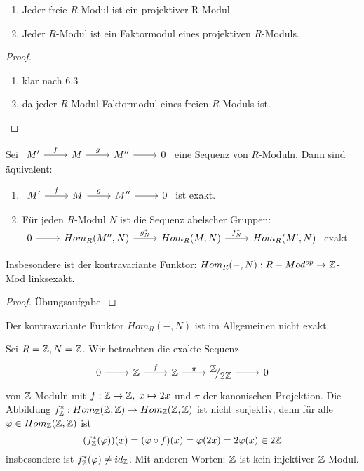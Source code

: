 \begin{fo}\label{6.4}
	\begin{enumerate} [label= \alph*)]
		\item Jeder freie $R$-Modul ist ein projektiver R-Modul
		\item Jeder $R$-Modul ist ein Faktormodul eines projektiven $R$-Moduls. 
	\end{enumerate}
\end{fo}
\begin{proof}
	\begin{enumerate} [label= \alph*)]
		\item klar nach 6.3
		\item da jeder $R$-Modul Faktormodul eines freien $R$-Moduls ist. 
	\end{enumerate}
\end{proof}
\begin{sa}\label{6.5}
	Sei $\begin{tikzcd}
	 M' \arrow{r}{f} & M \arrow{r}{g} & M'' \arrow{r} & 0
	\end{tikzcd} $ eine Sequenz von $R$-Moduln. Dann sind äquivalent:
	\begin{enumerate} [label= \roman*)]
		\item $\begin{tikzcd}
		M' \arrow{r}{f} & M \arrow{r}{g} & M'' \arrow{r} & 0
		\end{tikzcd} $ ist exakt.
		\item Für jeden $R$-Modul $N$ ist die Sequenz abelscher Gruppen: \\
		$\begin{tikzcd}
		0  \arrow{r} & Hom_{R}(M'',N) \arrow{r}{g_{N}^{*}} & Hom_{R}(M,N)  \arrow{r}{f_{N}^{*}} & Hom_{R}(M',N) \end{tikzcd}$ exakt.
	\end{enumerate}
	Insbesondere ist der kontravariante Funktor: $Hom_R(-,N): R-Mod^{op} \to \mathbb{Z}$-Mod  linksexakt.
\end{sa}
\begin{proof}
	Übungsaufgabe.
\end{proof}
\begin{anm}
	Der kontravariante Funktor $Hom_R(-,N) $ ist im Allgemeinen nicht exakt.
\end{anm}
\begin{bsp}
	Sei $ R= \mathbb{Z} , N = \mathbb{Z} $. Wir betrachten die exakte Sequenz \\
	 $$\begin{tikzcd}
	0  \arrow{r} & \Z \arrow{r}{f} & \Z \arrow{r}{\pi} & \QR{\Z}{2\Z} \arrow{r} & 0
	\end{tikzcd} $$ von $\mathbb{Z}$-Moduln mit $f: \mathbb{Z} \to \mathbb{Z} ,\; x \mapsto 2x$ und $ \pi $ der kanonischen Projektion. Die Abbildung $ f_{\mathbb{Z}}^{*} : Hom_{\mathbb{Z}}(\mathbb{Z},\mathbb{Z}) \to Hom_{\mathbb{Z}}(\mathbb{Z},\mathbb{Z})$ ist nicht surjektiv, denn für alle $\varphi \in Hom_{\mathbb{Z}}(\mathbb{Z},\mathbb{Z})$ ist $$ (f_{\mathbb{Z}}^{*}(\varphi))(x) = (\varphi \circ f)(x) = \varphi(2x) =2 \varphi(x) \in 2\mathbb{Z}$$
	insbesondere ist $ f_{\mathbb{Z}}^{*}(\varphi) \neq id_{\mathbb{Z}}$. Mit anderen Worten: $\mathbb{Z}$ ist kein injektiver $\mathbb{Z}$-Modul.
\end{bsp}
